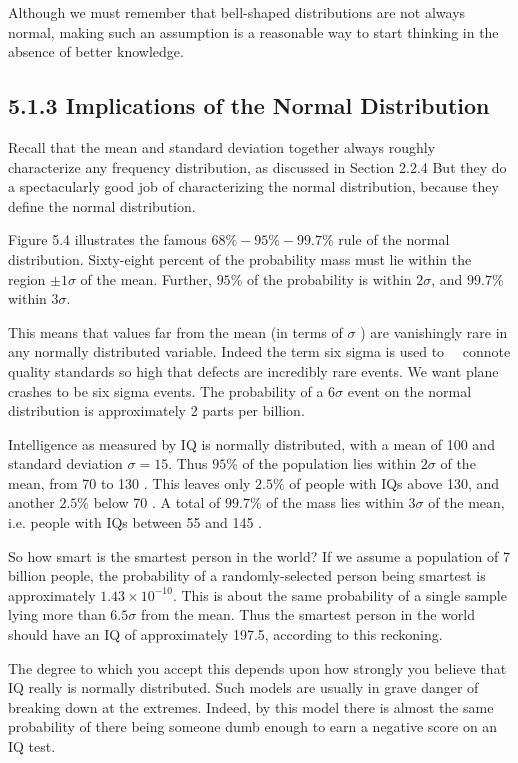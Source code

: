 \documentclass[10pt]{article}
\begin{document}
Although we must remember that bell-shaped distributions are not always normal, making such an assumption is a reasonable way to start thinking in the absence of better knowledge.

\subsection*{5.1.3 Implications of the Normal Distribution}
Recall that the mean and standard deviation together always roughly characterize any frequency distribution, as discussed in Section 2.2.4 But they do a spectacularly good job of characterizing the normal distribution, because they define the normal distribution.

Figure 5.4 illustrates the famous $68 \%-95 \%-99.7 \%$ rule of the normal distribution. Sixty-eight percent of the probability mass must lie within the region $\pm 1 \sigma$ of the mean. Further, $95 \%$ of the probability is within $2 \sigma$, and $99.7 \%$ within $3 \sigma$.

This means that values far from the mean (in terms of $\sigma$ ) are vanishingly rare in any normally distributed variable. Indeed the term six sigma is used to\
\
connote quality standards so high that defects are incredibly rare events. We want plane crashes to be six sigma events. The probability of a $6 \sigma$ event on the normal distribution is approximately 2 parts per billion.

Intelligence as measured by IQ is normally distributed, with a mean of 100 and standard deviation $\sigma=15$. Thus $95 \%$ of the population lies within $2 \sigma$ of the mean, from 70 to 130 . This leaves only $2.5 \%$ of people with IQs above 130, and another $2.5 \%$ below 70 . A total of $99.7 \%$ of the mass lies within $3 \sigma$ of the mean, i.e. people with IQs between 55 and 145 .

So how smart is the smartest person in the world? If we assume a population of 7 billion people, the probability of a randomly-selected person being smartest is approximately $1.43 \times 10^{-10}$. This is about the same probability of a single sample lying more than $6.5 \sigma$ from the mean. Thus the smartest person in the world should have an IQ of approximately 197.5, according to this reckoning.

The degree to which you accept this depends upon how strongly you believe that IQ really is normally distributed. Such models are usually in grave danger of breaking down at the extremes. Indeed, by this model there is almost the same probability of there being someone dumb enough to earn a negative score on an IQ test.
\end{document}
